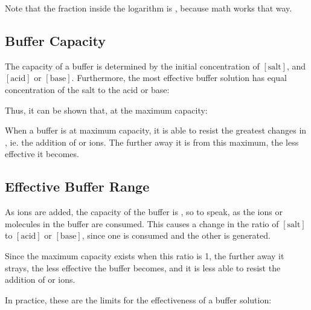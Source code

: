 				Note that the fraction inside the logarithm is , because math works that way.




		\subsection{Buffer Capacity}

			The capacity of a buffer is determined by the initial concentration of $[\mathrm{salt}]$, and $[\mathrm{acid}]$ or $[\mathrm{base}]$.
			Furthermore, the most effective buffer solution has equal concentration of the salt to the acid or base:

			\mathdiagram{
				\[ \frac{[\mathrm{salt}]}{[\mathrm{acid}]} = 1 \hspace{12mm}
					\frac{[\mathrm{salt}]}{[\mathrm{base}]} = 1\]
			}

			Thus, it can be shown that, at the maximum capacity:

			\mathdiagram{
				\[ \MpH = \MpKa \hspace{12mm} \MpOH = \MpKb \]
			}

			When a buffer is at maximum capacity, it is able to resist the greatest changes in \pH{}, ie. the addition of  or 
			ions. The further away it is from this maximum, the less effective it becomes.



		\subsection{Effective Buffer Range}

			As  ions are added, the capacity of the buffer is , so to speak, as the ions or molecules in the buffer are
			consumed. This causes a change in the ratio of $[\mathrm{salt}]$ to $[\mathrm{acid}]$ or $[\mathrm{base}]$, since one is consumed
			and the other is generated.

			Since the maximum capacity exists when this ratio is 1, the further away it strays, the less effective the buffer becomes,
			and it is less able to resist the addition of  or  ions.

			In practice, these are the limits for the effectiveness of a buffer solution:


